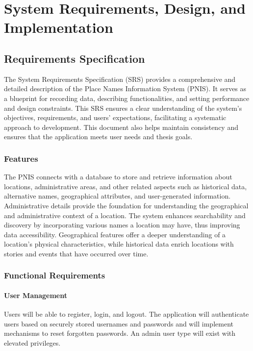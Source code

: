\chapter{System Requirements, Design, and Implementation}



\section{Requirements Specification}
The System Requirements Specification (SRS) provides a comprehensive and detailed description of the Place Names Information System (PNIS). It serves as a blueprint for recording data, describing functionalities, and setting performance and design constraints. This SRS ensures a clear understanding of the system's objectives, requirements, and users' expectations, facilitating a systematic approach to development. This document also helps maintain consistency and ensures that the application meets user needs and thesis goals.

\subsection{Features}
The PNIS connects with a database to store and retrieve information about locations, administrative areas, and other related aspects such as historical data, alternative names, geographical attributes, and user-generated information.
Administrative details provide the foundation for understanding the geographical and administrative context of a location. The system enhances searchability and discovery by incorporating various names a location may have, thus improving data accessibility. Geographical features offer a deeper understanding of a location’s physical characteristics, while historical data enrich locations with stories and events that have occurred over time.

\subsection{Functional Requirements}

\subsubsection{User Management}
Users will be able to register, login, and logout. The application will authenticate users based on securely stored usernames and passwords and will implement mechanisms to reset forgotten passwords. An admin user type will exist with elevated privileges.

